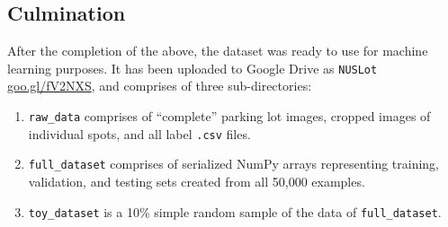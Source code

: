\documentclass[a4paper, 11pt]{article} %
\begin{document}
	\subsection{Culmination}
		After the completion of the above, the dataset was ready to use for machine learning purposes. It
		has been uploaded to Google Drive as \texttt{NUSLot}
		\hyperlink{https://goo.gl/fV2NXS}{goo.gl/fV2NXS}, and comprises of 
		three sub-directories:
		\begin{enumerate}
			\item \texttt{raw\_data} comprises of ``complete'' parking lot images, cropped images of
			individual spots, and all label \texttt{.csv} files.
			\item \texttt{full\_dataset} comprises of serialized NumPy arrays 
			representing
			training, validation, and testing sets created from all 50,000 examples. 
			\item \texttt{toy\_dataset} is a 10\% simple random sample of the 
			data of
			\texttt{full\_dataset}.
		\end{enumerate}
\end{document}
